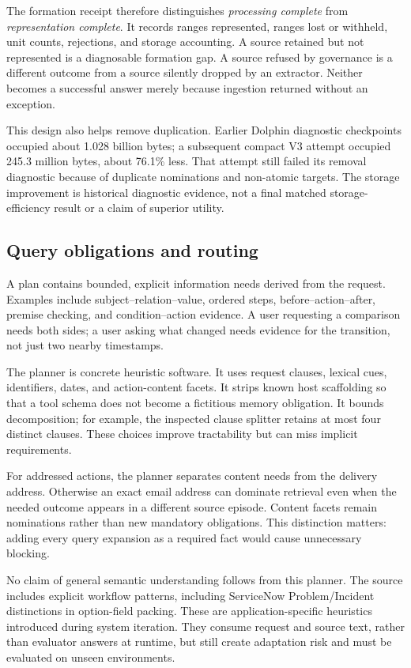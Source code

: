 \documentclass[10pt,twocolumn]{article}
\begin{document}
The formation receipt therefore distinguishes \emph{processing complete} from \emph{representation complete}. It records ranges represented, ranges lost or withheld, unit counts, rejections, and storage accounting. A source retained but not represented is a diagnosable formation gap. A source refused by governance is a different outcome from a source silently dropped by an extractor. Neither becomes a successful answer merely because ingestion returned without an exception.

This design also helps remove duplication. Earlier Dolphin diagnostic checkpoints occupied about 1.028 billion bytes; a subsequent compact V3 attempt occupied 245.3 million bytes, about 76.1\% less. That attempt still failed its removal diagnostic because of duplicate nominations and non-atomic targets. The storage improvement is historical diagnostic evidence, not a final matched storage-efficiency result or a claim of superior utility.

\subsection{Query obligations and routing}
A plan contains bounded, explicit information needs derived from the request. Examples include subject--relation--value, ordered steps, before--action--after, premise checking, and condition--action evidence. A user requesting a comparison needs both sides; a user asking what changed needs evidence for the transition, not just two nearby timestamps.

The planner is concrete heuristic software. It uses request clauses, lexical cues, identifiers, dates, and action-content facets. It strips known host scaffolding so that a tool schema does not become a fictitious memory obligation. It bounds decomposition; for example, the inspected clause splitter retains at most four distinct clauses. These choices improve tractability but can miss implicit requirements.

For addressed actions, the planner separates content needs from the delivery address. Otherwise an exact email address can dominate retrieval even when the needed outcome appears in a different source episode. Content facets remain nominations rather than new mandatory obligations. This distinction matters: adding every query expansion as a required fact would cause unnecessary blocking.

No claim of general semantic understanding follows from this planner. The source includes explicit workflow patterns, including ServiceNow Problem/Incident distinctions in option-field packing. These are application-specific heuristics introduced during system iteration. They consume request and source text, rather than evaluator answers at runtime, but still create adaptation risk and must be evaluated on unseen environments.
\end{document}
